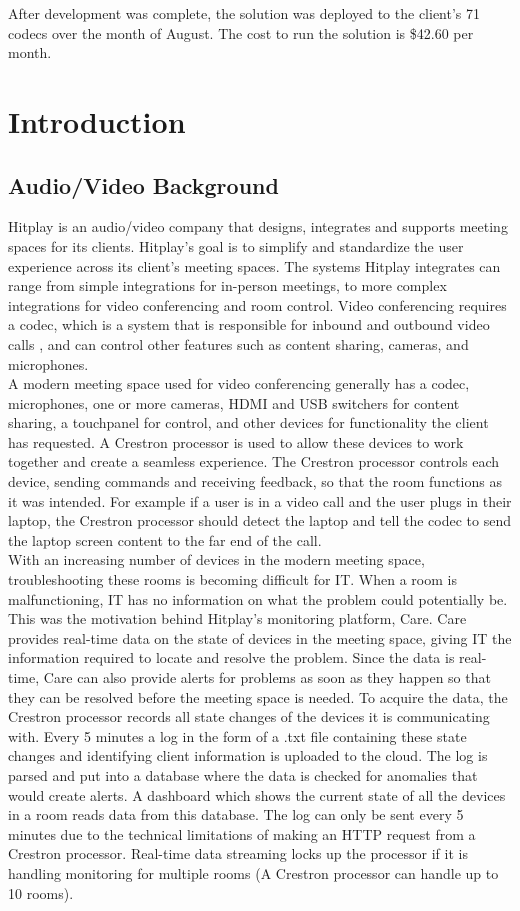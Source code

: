 \documentclass[letterpaper,12pt]{article}
\begin{document}
After development was complete, the solution was deployed to the client's 71 codecs over the month of August. The cost to run the solution is \$42.60 per month.
\pagebreak
\section{Introduction}
\subsection{Audio/Video Background}
Hitplay is an audio/video company that designs, integrates and supports meeting spaces for its clients. Hitplay's goal is to simplify and standardize the user experience across its client's meeting spaces. The systems Hitplay integrates can range from simple integrations for in-person meetings, to more complex integrations for video conferencing and room control. Video conferencing requires a codec, which is a system that is responsible for inbound and outbound video calls \cite{whatisacodec}, and can control other features such as content sharing, cameras, and microphones.\\

A modern meeting space used for video conferencing generally has a codec, microphones, one or more cameras, HDMI and USB switchers for content sharing, a touchpanel for control, and other devices for functionality the client has requested. A Crestron processor is used to allow these devices to work together and create a seamless experience. The Crestron processor controls each device, sending commands and receiving feedback, so that the room functions as it was intended. For example if a user is in a video call and the user plugs in their laptop, the Crestron processor should detect the laptop and tell the codec to send the laptop screen content to the far end of the call.\\

With an increasing number of devices in the modern meeting space, troubleshooting these rooms is becoming difficult for IT. When a room is malfunctioning, IT has no information on what the problem could potentially be. This was the motivation behind Hitplay's monitoring platform, Care. Care provides real-time data on the state of devices in the meeting space, giving IT the information required to locate and resolve the problem. Since the data is real-time, Care can also provide alerts for problems as soon as they happen so that they can be resolved before the meeting space is needed. To acquire the data, the Crestron processor records all state changes of the devices it is communicating with. Every 5 minutes a log in the form of a .txt file containing these state changes and identifying client information is uploaded to the cloud. The log is parsed and put into a database where the data is checked for anomalies that would create alerts. A dashboard which shows the current state of all the devices in a room reads data from this database. The log can only be sent every 5 minutes due to the technical limitations of making an HTTP request from a Crestron processor. Real-time data streaming locks up the processor if it is handling monitoring for multiple rooms (A Crestron processor can handle up to 10 rooms). 
\end{document}
